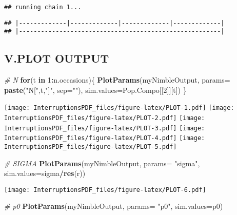\documentclass[
]{article}
\newenvironment{Shaded}{\begin{snugshade}}{\end{snugshade}}
\newcommand{\CommentTok}[1]{\textcolor[rgb]{0.56,0.35,0.01}{\textit{#1}}}
\newcommand{\ControlFlowTok}[1]{\textcolor[rgb]{0.13,0.29,0.53}{\textbf{#1}}}
\newcommand{\DataTypeTok}[1]{\textcolor[rgb]{0.13,0.29,0.53}{#1}}
\newcommand{\DecValTok}[1]{\textcolor[rgb]{0.00,0.00,0.81}{#1}}
\newcommand{\KeywordTok}[1]{\textcolor[rgb]{0.13,0.29,0.53}{\textbf{#1}}}
\newcommand{\NormalTok}[1]{#1}
\newcommand{\OperatorTok}[1]{\textcolor[rgb]{0.81,0.36,0.00}{\textbf{#1}}}
\newcommand{\StringTok}[1]{\textcolor[rgb]{0.31,0.60,0.02}{#1}}
\begin{document}
\begin{verbatim}
## running chain 1...
\end{verbatim}

\begin{verbatim}
## |-------------|-------------|-------------|-------------|
## |-------------------------------------------------------|
\end{verbatim}

\hypertarget{v.plot-output}{%
\subsection{V.PLOT OUTPUT}\label{v.plot-output}}

\begin{Shaded}
\begin{Highlighting}[]
\CommentTok{# N}
\ControlFlowTok{for}\NormalTok{(t }\ControlFlowTok{in} \DecValTok{1}\OperatorTok{:}\NormalTok{n.occasions)\{ }
  \KeywordTok{PlotParams}\NormalTok{(myNimbleOutput,}
             \DataTypeTok{params=} \KeywordTok{paste}\NormalTok{(}\StringTok{"N["}\NormalTok{,t,}\StringTok{"]"}\NormalTok{, }\DataTypeTok{sep=}\StringTok{""}\NormalTok{),}
             \DataTypeTok{sim.values=}\NormalTok{Pop.Compo[[}\DecValTok{2}\NormalTok{]][t])}
\NormalTok{\}}
\end{Highlighting}
\end{Shaded}

\texttt{[image: InterruptionsPDF\_files/figure-latex/PLOT-1.pdf]}
\texttt{[image: InterruptionsPDF\_files/figure-latex/PLOT-2.pdf]}
\texttt{[image: InterruptionsPDF\_files/figure-latex/PLOT-3.pdf]}
\texttt{[image: InterruptionsPDF\_files/figure-latex/PLOT-4.pdf]}
\texttt{[image: InterruptionsPDF\_files/figure-latex/PLOT-5.pdf]}

\begin{Shaded}
\begin{Highlighting}[]
\CommentTok{# SIGMA}
\KeywordTok{PlotParams}\NormalTok{(myNimbleOutput, }\DataTypeTok{params=} \StringTok{"sigma"}\NormalTok{, }\DataTypeTok{sim.values=}\NormalTok{sigma}\OperatorTok{/}\KeywordTok{res}\NormalTok{(r))}
\end{Highlighting}
\end{Shaded}

\texttt{[image: InterruptionsPDF\_files/figure-latex/PLOT-6.pdf]}

\begin{Shaded}
\begin{Highlighting}[]
\CommentTok{# p0}
\KeywordTok{PlotParams}\NormalTok{(myNimbleOutput, }\DataTypeTok{params=} \StringTok{"p0"}\NormalTok{, }\DataTypeTok{sim.values=}\NormalTok{p0)}
\end{Highlighting}
\end{Shaded}
\end{document}
